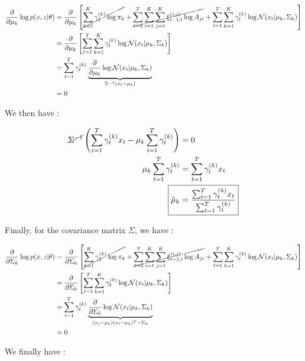\documentclass[11pt]{article}
\begin{document}
\begin{enumerate}
\begin{align*}
\frac{\partial}{\partial \mu_k} \log p(x,z|\theta) & = \frac{\partial}{\partial \mu_k}\left[ \cancel{\sum_{k=1}^{K} \gamma_{1}^{(k)} \log \pi_{k}} + \cancel{\sum_{t=2}^{T} \sum_{i=1}^{K}\sum_{j = 1}^{K} \xi_{t-1,t}^{(i,j)} \log A_{ji}} + \sum_{t=1}^{T} \sum_{k=1}^{K} \gamma_{t}^{(k)} \log\mathcal{N}(x_t|\mu_k,\Sigma_k) \right]\\
												   & = \frac{\partial}{\partial \mu_k}\left[ \sum_{t=1}^{T} \sum_{k=1}^{K} \gamma_{t}^{(k)} \log\mathcal{N}(x_t|\mu_k,\Sigma_k) \right]\\
												   & = \sum_{t=1}^{T} \gamma_{t}^{(k)} \underbrace{\frac{\partial}{\partial \mu_k} \log \mathcal{N}(x_t|\mu_k,\Sigma_k)}_{\Sigma^{-1}(x_t - \mu_k)}\\
												   & = 0
\end{align*}

We then have :

\begin{align*}
\cancel{\Sigma^{-1}} \left(\sum_{t=1}^T \gamma_{t}^{(k)} x_t - \mu_k \sum_{t=1}^T \gamma_{t}^{(k)} \right) & = 0 \\
\mu_k \sum_{t=1}^T \gamma_{t}^{(k)} & = \sum_{t=1}^T \gamma_{t}^{(k)} x_t \\
\Aboxed{\hat{\mu}_k &= \frac{\sum_{t=1}^T \gamma_{t}^{(k)} x_t}{\sum_{t=1}^T \gamma_{t}^{(k)}}}
\end{align*}

Finally, for the covariance matrix $\Sigma$, we have :

\begin{align*}
\frac{\partial}{\partial \Sigma_{k}} \log p(x,z|\theta) & = \frac{\partial}{\partial \Sigma_k}\left[ \cancel{\sum_{k=1}^{K} \gamma_{1}^{(k)} \log \pi_{k}} + \cancel{\sum_{t=2}^{T} \sum_{i=1}^{K}\sum_{j = 1}^{K} \xi_{t-1,t}^{(i,j)} \log A_{ji}} + \sum_{t=1}^{T} \sum_{k=1}^{K} \gamma_{t}^{(k)} \log\mathcal{N}(x_t|\mu_k,\Sigma_k) \right]\\
												   & = \frac{\partial}{\partial \Sigma_k}\left[ \sum_{t=1}^{T} \sum_{k=1}^{K} \gamma_{t}^{(k)} \log\mathcal{N}(x_t|\mu_k,\Sigma_k) \right]\\
												   & = \sum_{t=1}^{T} \gamma_{t}^{(k)} \underbrace{\frac{\partial}{\partial \Sigma_k} \log \mathcal{N}(x_t|\mu_k,\Sigma_k)}_{(x_t-\mu_k)(x_t-\mu_k)^T - \Sigma_k}\\
												   & = 0
\end{align*}

We finally have :


\end{enumerate}
\end{document}
